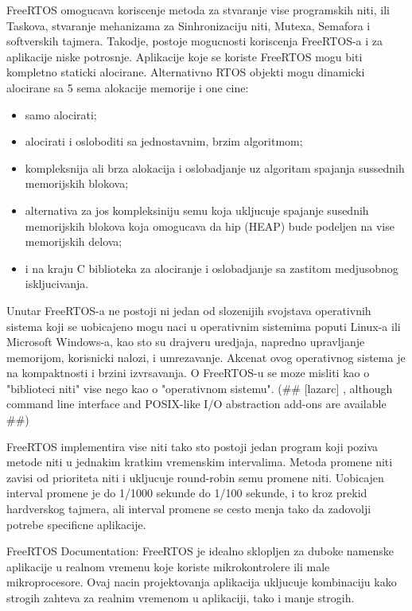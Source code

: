 \documentclass[a4paper,12pt, master]{etf}
\begin{document}
	FreeRTOS omogucava koriscenje metoda za stvaranje vise programskih niti, ili Taskova, 
	stvaranje mehanizama za Sinhronizaciju niti, Mutexa, Semafora i softverskih tajmera. 
	Takodje, postoje mogucnosti koriscenja FreeRTOS-a i za aplikacije niske potrosnje. 
	Aplikacije koje se koriste FreeRTOS mogu biti kompletno staticki alocirane. Alternativno 
	RTOS objekti mogu dinamicki	alocirane sa 5 sema alokacije memorije i one cine:
	
	\begin{itemize}
		\item samo alocirati;
		\item alocirati i osloboditi sa jednostavnim, brzim algoritmom;
		\item kompleksnija ali brza alokacija i oslobadjanje uz algoritam spajanja sussednih
		memorijskih blokova;
		\item alternativa za jos kompleksiniju semu koja ukljucuje spajanje susednih 
		memorijskih	blokova	koja omogucava da hip (HEAP) bude podeljen na vise memorijskih 
		delova;
		\item i na kraju C biblioteka za alociranje i oslobadjanje sa zastitom medjusobnog 
		iskljucivanja.
	\end{itemize}

	Unutar FreeRTOS-a ne postoji ni jedan od slozenijih svojstava operativnih sistema koji se
	uobicajeno mogu naci u operativnim sistemima poputi Linux-a ili Microsoft Windows-a, kao 
	sto su drajveru uredjaja, napredno upravljanje memorijom, korisnicki nalozi, i 
	umrezavanje. Akcenat ovog operativnog sistema je na kompaktnosti i brzini izvrsavanja. O 
	FreeRTOS-u se moze misliti kao o "biblioteci niti" vise nego kao o "operativnom sistemu". 
	(\#\# [lazarc] , although command line interface and POSIX-like I/O abstraction add-ons 
	are available \#\#)

	FreeRTOS implementira vise niti tako sto postoji jedan program koji poziva metode niti u
	jednakim kratkim vremenskim intervalima. Metoda promene niti zavisi od prioriteta niti i
	ukljucuje round-robin semu promene niti. Uobicajen interval promene je do 1/1000 sekunde do
	1/100 sekunde, i to kroz prekid hardverskog tajmera, ali interval promene se cesto menja 
	tako da zadovolji potrebe specificne aplikacije.

	FreeRTOS Documentation:
	FreeRTOS je idealno sklopljen za duboke namenske aplikacije u realnom vremenu koje koriste
	mikrokontrolere ili male mikroprocesore. Ovaj nacin projektovanja aplikacija ukljucuje
	kombinaciju kako strogih zahteva za realnim vremenom u aplikaciji, tako i manje strogih.
\end{document}

